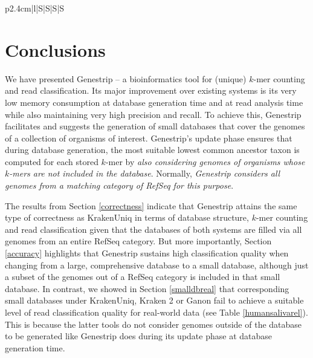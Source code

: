 \documentclass[pdflatex,sn-vancouver-num]{sn-jnl}
\begin{document}
\begin{table}[h]
\begin{tabular}{p{2.4cm}|l|S|S|S|S}
        \end{tabular}
        \caption{Read analysis performance comparison between KrakenUniq, Kraken 2, Ganon and Genestrip with 10 threads for each tool. For \texttt{MicrobialDB} we set the parameter \texttt{--preload-size 96G} to limit KrakenUniq's main memory according to \cite{lowmemkraken}. (Otherwise, the analysis with KrakenUniq would have not been possible on the given PC.)}\label{analysisperf}
    \end{table}


    \section{Conclusions}\label{discussion}

    We have presented Genestrip -- a bioinformatics tool for (unique) $k$-mer counting and read classification. Its major improvement over existing systems is its very low memory consumption at database generation time and at read analysis time while also maintaining very high precision and recall. To achieve this, Genestrip facilitates and suggests the generation of small databases that cover the genomes of a collection of organisms of interest. Genestrip's update phase ensures that during database generation, the most suitable lowest common ancestor taxon is computed for each stored $k$-mer by \emph{also considering genomes of organisms whose $k$-mers are not included in the database}. Normally, \emph{Genestrip considers all genomes from a matching category of RefSeq for this purpose}.

    The results from Section \ref{correctness} indicate that Genestrip attains the same type of correctness as KrakenUniq in terms of database structure, $k$-mer counting and read classification given that the databases of both systems are filled via all genomes from an entire RefSeq category. But more importantly, Section \ref{accuracy} highlights that Genestrip sustains high classification quality when changing from a large, comprehensive database to a small database, although just a subset of the genomes out of a RefSeq category is included in that small database. In contrast, we showed in Section \ref{smalldbreal} that corresponding small databases under KrakenUniq, Kraken 2 or Ganon fail to achieve a suitable level of read classification quality for real-world data (see Table \ref{humansalivarel}). This is because the latter tools do not consider genomes outside of the database to be generated like Genestrip does during its update phase at database generation time.
\end{document}
